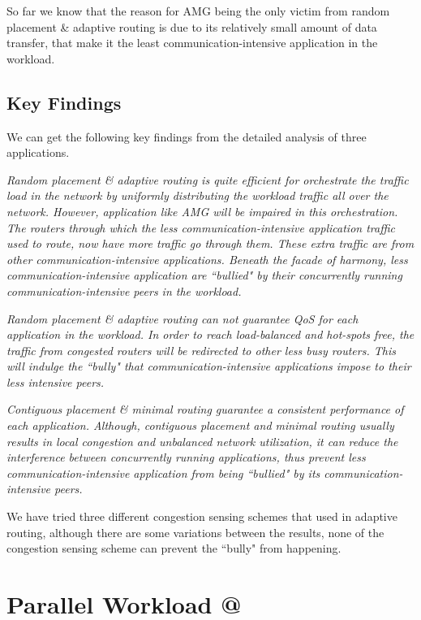 \documentclass[conference,compsoc]{IEEEtran}
\makeatletter
\newcommand{\Rmnum}[1]{\expandafter\@slowromancap\romannumeral #1@}
\makeatother
\begin{document}
So far we know that the reason for AMG being the only victim from random placement \& adaptive routing is due to its relatively small amount of data transfer, that make it the least communication-intensive application in the workload.

\subsection{Key Findings}
We can get the following key findings from the detailed analysis of three applications. 

\emph{Random placement \& adaptive routing is quite efficient for orchestrate the traffic load in the network by uniformly distributing the workload traffic all over the network. However, application like AMG will be impaired in this orchestration. The routers through which the less communication-intensive application traffic used to route, now have more traffic go through them. These extra traffic are from other communication-intensive applications. Beneath the facade of harmony, less communication-intensive application are ``bullied" by their concurrently running communication-intensive peers in the workload. }

\emph{Random placement \& adaptive routing can not guarantee QoS for each application in the workload. In order to reach load-balanced and hot-spots free, the traffic from congested routers will be redirected to other less busy routers. This will indulge the ``bully" that communication-intensive applications impose to their less intensive peers.}

\emph{Contiguous placement \& minimal routing guarantee a consistent performance of each application. Although, contiguous placement and minimal routing usually results in local congestion and unbalanced network utilization, it can reduce the interference between concurrently running applications, thus prevent less communication-intensive application from being ``bullied" by its communication-intensive peers.}

We have tried three different congestion sensing schemes that used in adaptive routing\cite{won-prog-adaptive}, although there are some variations between the results, none of the congestion sensing scheme can prevent the ``bully" from happening.

\section{Parallel Workload \Rmnum{2 }}
\label{sec:workload-2}
\end{document}
